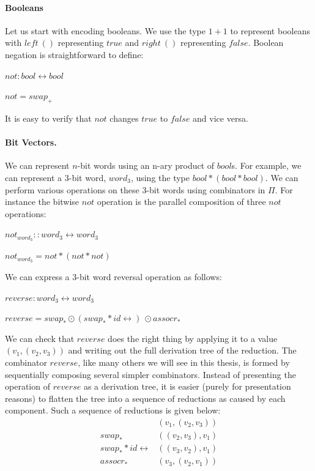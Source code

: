 \documentclass{article}
\newcommand{\swapp}{\ensuremath{\mathit{swap}_+}}
\newcommand{\swapt}{\ensuremath{\mathit{swap}_*}}
\newcommand{\assocrt}{\ensuremath{\mathit{assocr}_*}}
\newcommand{\idc}{\mathit{id}\!\!\leftrightarrow}
\begin{document}
\paragraph*{Booleans}
Let us start with encoding booleans. We use the type \ensuremath{1+1} to
represent booleans with \ensuremath{\mathit{left} ~()} representing \ensuremath{\mathit{true}} and
\ensuremath{\mathit{right}~()} representing \ensuremath{\mathit{false}}.
Boolean negation is straightforward to define:

\ensuremath{\mathit{not} : \mathit{bool} \leftrightarrow \mathit{bool}}

\ensuremath{\mathit{not} = \swapp}

\noindent
It is easy to verify that \ensuremath{\mathit{not}} changes \ensuremath{\mathit{true}} to \ensuremath{\mathit{false}} and
vice versa.

\paragraph*{Bit Vectors.}
We can represent $n$-bit words using an n-ary product of
\ensuremath{\mathit{bool}}s. For example, we can represent a 3-bit word, \ensuremath{\mathit{word}_3},
using the type \ensuremath{\mathit{bool} * (\mathit{bool} *  \mathit{bool})}.  We can perform various
operations on these 3-bit words using combinators in \ensuremath{\Pi }. For
instance the bitwise \ensuremath{\mathit{not}} operation is the parallel composition of
three \ensuremath{\mathit{not}} operations:

\ensuremath{\mathit{not}_{\mathit{word}_3} :: \mathit{word}_3 \leftrightarrow \mathit{word}_3}

\ensuremath{\mathit{not}_{\mathit{word}_3} = \mathit{not}  *  (\mathit{not}  *  \mathit{not})}

\noindent We can express a 3-bit word reversal operation as follows:

\ensuremath{\mathit{reverse} : \mathit{word}_3 \leftrightarrow \mathit{word}_3}

\ensuremath{\mathit{reverse} = \swapt \odot (\swapt  *  \idc)~ \odot \assocrt}

\noindent We can check that \ensuremath{\mathit{reverse}} does the right thing by
applying it to a value \ensuremath{(v_1, (v_2, v_3))} and writing out the full
derivation tree of the reduction.  The combinator \ensuremath{\mathit{reverse}}, like
many others we will see in this thesis, is formed by sequentially
composing several simpler combinators. Instead of presenting the
operation of \ensuremath{\mathit{reverse}} as a derivation tree, it is easier (purely
for presentation reasons) to flatten the tree into a sequence of
reductions as caused by each component. Such a sequence of reductions
is given below:
\[\begin{array}{rlr}
 & (v_1, (v_2, v_3)) \\
 \swapt & ((v_2, v_3), v_1) \\
 \swapt  *  \idc & ((v_3, v_2), v_1) \\
 \assocrt & (v_3, (v_2, v_1)) \\
 \end{array}\]
\end{document}
